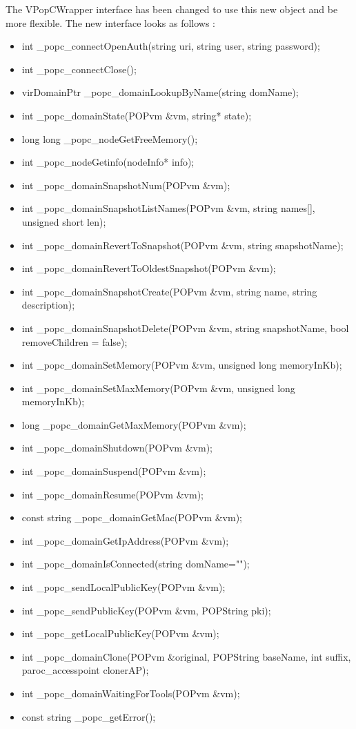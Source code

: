 The VPopCWrapper interface has been changed to use this new object and be more flexible. The new interface looks as follows : 
\begin{itemize}
\item int \_popc\_connectOpenAuth(string uri, string user, string password);
\item int \_popc\_connectClose();
\item virDomainPtr \_popc\_domainLookupByName(string domName);
\item int \_popc\_domainState(POPvm \&vm, string* state);
\item long long \_popc\_nodeGetFreeMemory();
\item int \_popc\_nodeGetinfo(nodeInfo* info);
\item int \_popc\_domainSnapshotNum(POPvm \&vm);
\item int \_popc\_domainSnapshotListNames(POPvm \&vm, string names[], unsigned short len);
\item int \_popc\_domainRevertToSnapshot(POPvm \&vm, string snapshotName);
\item int \_popc\_domainRevertToOldestSnapshot(POPvm \&vm);
\item int \_popc\_domainSnapshotCreate(POPvm \&vm, string name, string description);
\item int \_popc\_domainSnapshotDelete(POPvm \&vm, string snapshotName, bool removeChildren = false);
\item int \_popc\_domainSetMemory(POPvm \&vm, unsigned long memoryInKb);
\item int \_popc\_domainSetMaxMemory(POPvm \&vm, unsigned long memoryInKb);
\item long \_popc\_domainGetMaxMemory(POPvm \&vm);
\item int \_popc\_domainShutdown(POPvm \&vm);
\item int \_popc\_domainSuspend(POPvm \&vm);
\item int \_popc\_domainResume(POPvm \&vm);
\item const string \_popc\_domainGetMac(POPvm \&vm);
\item int \_popc\_domainGetIpAddress(POPvm \&vm);
\item int \_popc\_domainIsConnected(string domName="");
\item int \_popc\_sendLocalPublicKey(POPvm \&vm);
\item int \_popc\_sendPublicKey(POPvm \&vm, POPString pki);
\item int \_popc\_getLocalPublicKey(POPvm \&vm);
\item int \_popc\_domainClone(POPvm \&original, POPString baseName, int suffix, paroc\_accesspoint clonerAP);
\item int \_popc\_domainWaitingForTools(POPvm \&vm);
\item const string \_popc\_getError();
\end{itemize}

